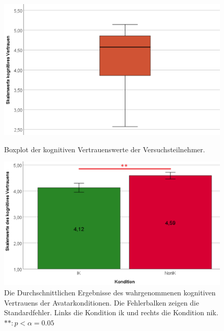\documentclass[a4paper,11pt]{article}%
\renewcommand{\\}{\vspace*{0.5\baselineskip} \newline}
\begin{document}
	\begin{figure}[H]
   \begin{minipage}[t]{.5\linewidth} %
      \includegraphics[width=\linewidth]{Abbildungen/AuswertungDiagramme/BP_kognitivesVertrauen.png}
      \caption[Boxplot der kognitiven Vertrauenswerte der Versuchsteilnehmer]{Boxplot der kognitiven Vertrauenswerte der Versuchsteilnehmer.}
            \label{SD_kognitivesVertrauenBP}
   \end{minipage}
   \hspace{.02\linewidth}%
   \begin{minipage}[t]{.5\linewidth} %
     \includegraphics[width=\linewidth]{Abbildungen/AuswertungDiagramme/H1_Mittelwerte.png}
      \caption[Mittelwerte und der Standardfehler der kognitiven Vertrauenswerte]{Die Durchschnittlichen Ergebnisse des wahrgenommenen kognitiven Vertrauens der Avatarkonditionen. Die Fehlerbalken zeigen die Standardfehler. Links die Kondition \ac{ik} und rechts die Kondition \ac{nik}. $** : p < \alpha = 0.05$}
       \label{H1_Mittelwerte_Auswertung}
   \end{minipage}
\end{figure}
\end{document}
